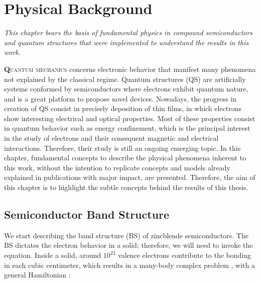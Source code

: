\chapter{Physical Background }
\label{chap:Chapter-1}
\textit{This chapter bears the basis of fundamental physics in compound semiconductors and
quantum structures that were implemented to understand the results in this work.}
\vfill
\minitoc
\newpage

\lettrine[lines=3, lraise=.1, nindent=0mm, slope=0mm]{\textbf{Q}}{uantum mechanics}  concerns electronic behavior that manifest many phenomena not explained by the classical regime. Quantum structures (QS) are artificially systems conformed by semiconductors where electrons exhibit quantum nature, and is a great platform to propose novel devices. Nowadays, the progress in creation of QS consist in precisely deposition of thin films, in which electrons show interesting electrical and optical properties\cite{sundram1991structures}. Most of these properties consist in quantum behavior  such as energy confinement, which is the principal interest in the study of electrons and their 
consequent magnetic and electrical interactions.
Therefore,  their study is still an ongoing emerging topic. 
In this chapter, fundamental concepts to describe the physical phenomena inherent to this work, without the intention to replicate concepts and models already explained in publications with major impact, are presented. Therefore, the aim of this chapter is to highlight the subtle concepts behind the results of this thesis.

\section{Semiconductor Band Structure}
\label{sec:chapter-1-semiconductor}
\vspace{-10mm}
We start describing the band structure (\gls{BS}) of zincblende semiconductors. The \gls{BS} dictates the electron behavior in a solid; therefore, we will need to invoke the \sch equation. Inside a solid, around $10^{23}$ valence electrons contribute to the bonding in each cubic centimeter,  which results in a many-body complex problem \cite{piprek2017handbook}, with a general Hamiltonian \cite{alloul2010introduction,cardona2005fundamentals}: 

